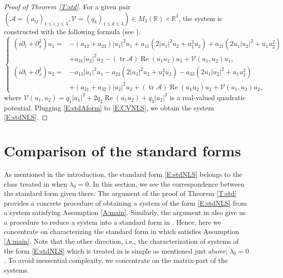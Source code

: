 \documentclass[11pt,a4paper,oneside]{amsart}
\theoremstyle{plain}
\theoremstyle{remark}
\numberwithin{equation}{section}
\newcommand{\R}{\mathbb{R}}
\renewcommand{\Re}{\operatorname{Re}}
\def\le{\leqslant}
\DeclareMathOperator{\tr}{tr}
\theoremstyle{definition}
\newcommand{\ol}{\overline}
\begin{document}
\begin{proof}[Proof of Theorem \ref{T:std}]
For a given pair $(\mathscr{A}=(a_{ij})_{1\le i,j \le 3}, \mathscr{V}=(q_k)_{1\le k \le 3} )\in M_3(\R) \times \R^3$, the system is constructed with the following formula (see \cite{MSU1}).
\begin{equation}\label{E:CVNLS}
\left\{
\begin{aligned}
	(i  \partial_t + \partial_x^2 )u_1={}&
-(a_{12}+a_{23}) |u_1|^2 u_1 +a_{11}(2|u_1|^2 u_2 + u_1^2\ol{u_2})+a_{21} (2 u_1 |u_2|^2 + \ol{u_1}u_2^2) \\&+ a_{31} |u_2|^2u_2
	 - (\tr{\mathscr{A}}) \Re (\overline{u_1} u_2) u_1 +\mathcal{V}(u_1,u_2) u_1, \\
	(i  \partial_t + \partial_x^2 )u_2={}&
-a_{13} |u_1|^2 u_1-a_{23}(2|u_1|^2 u_2 + u_1^2\ol{u_2})-a_{33} (2 u_1 |u_2|^2 + \ol{u_1}u_2^2) \\&+ (a_{21}+a_{32}) |u_2|^2u_2
	 + (\tr{\mathscr{A}}) \Re (\overline{u_1} u_2) u_2 + \mathcal{V}(u_1,u_2)u_2,
\end{aligned}
\right.
\end{equation}
where $\mathcal{V}(u_1,u_2)=q_1 |u_1|^2 + 2q_2 \Re (\overline{u_1}u_2)  + q_3 |u_2|^2$ is a real-valued quadratic potential.
Plugging \eqref{E:stdAform} to \eqref{E:CVNLS}, we obtain the system \eqref{E:stdNLS}.
\end{proof}



\appendix

\section{Comparison of the standard forms}\label{S:compare}

As mentioned in the introduction, the standard form \eqref{E:stdNLS} belongs to the class treated in \cite{M} when $\lambda_0=0$.
In this section, we see the correspondence between the standard form given there.
The argument of the proof of Theorem \ref{T:std} provides a concrete procedure of obtaining a system of the form \eqref{E:stdNLS} from a system satisfying Assumption \ref{A:main}.
Similarly, the argument in \cite{M} also give us a procedure to reduce a system into a standard form in \cite{M}.
Hence, here we concentrate on characterizing the standard form in \cite{M} which satisfies Assumption \ref{A:main}.
Note that the other direction, i.e., the characterization of systems of the form \eqref{E:stdNLS} which is treated in \cite{M} is simple as mentioned just above; $\lambda_0=0$.
%
To avoid inessential complexity, we concentrate on the matrix-part of the systems. 
\end{document}
